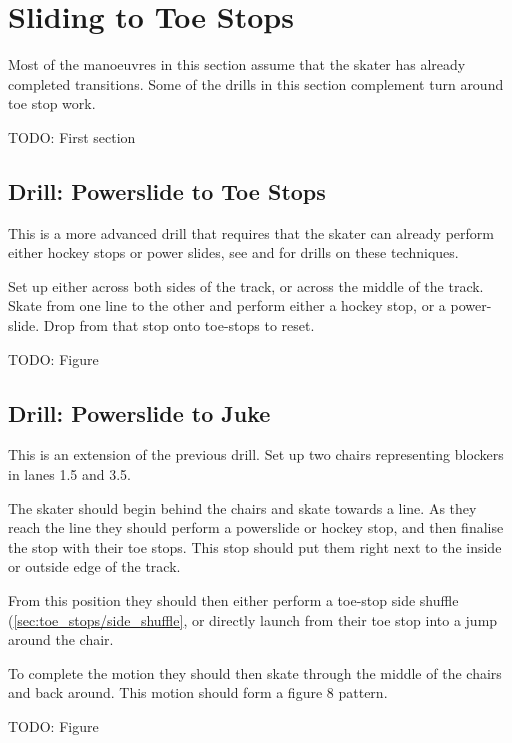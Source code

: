 \section{Sliding to Toe Stops}
\label{sec:toe_stops/slides}

Most of the manoeuvres in this section assume that the skater has already completed transitions.
Some of the drills in this section complement turn around toe stop work.    

{\color{red} TODO: First section}


\subsection*{Drill: Powerslide to Toe Stops} 
\label{drill:toe_stops/slides/powerslide}

This is a more advanced drill that requires that the skater can already perform either hockey stops or power slides, see  and  for drills on these techniques. 

Set up either across both sides of the track, or across the middle of the track. 
Skate from one line to the other and perform either a hockey stop, or a power-slide.
Drop from that stop onto toe-stops to reset.

{\color{red} TODO: Figure}

\subsection*{Drill: Powerslide to Juke} 
\label{drill:toe_stops/slides/powerslide_juke}

This is an extension of the previous drill.
Set up two chairs representing blockers in lanes 1.5 and 3.5. 

The skater should begin behind the chairs and skate towards a line.   
As they reach the line they should perform a powerslide or hockey stop, and then finalise the stop with their toe stops.
This stop should put them right next to the inside or outside edge of the track.

From this position they should then either perform a toe-stop side shuffle (\cref{sec:toe_stops/side_shuffle}, or directly launch from their toe stop into a jump around the chair.  

To complete the motion they should then skate through the middle of the chairs and back around.
This motion should form a figure 8 pattern.

{\color{red} TODO: Figure}
